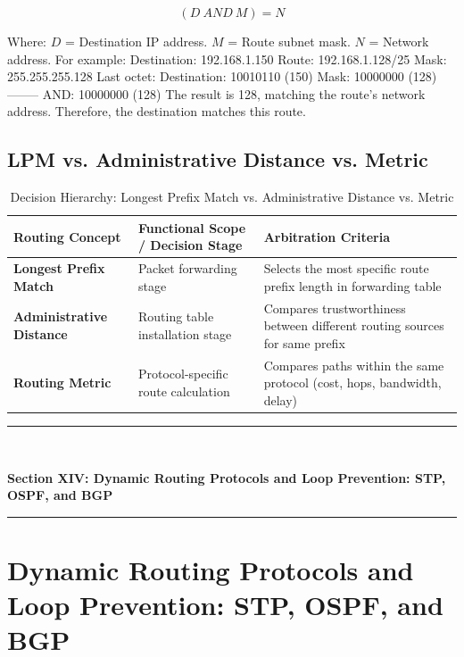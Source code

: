 \[
\boxed{(D\ AND\ M)=N}
\]

Where:
$D$ = Destination IP address.
$M$ = Route subnet mask.
$N$ = Network address.
For example:
Destination:
192.168.1.150
Route:
192.168.1.128/25
Mask:
255.255.255.128
Last octet:
Destination: 10010110 (150) Mask: 10000000 (128) -------- AND: 10000000 (128)
The result is 128, matching the route's network address.
Therefore, the destination matches this route.
\subsection{LPM vs. Administrative Distance vs. Metric}
\begin{table}[htbp]
\centering
\caption{Decision Hierarchy: Longest Prefix Match vs. Administrative Distance vs. Metric}
\label{tab:lpm_vs_ad_metric}
\begin{tabularx}{\textwidth}{p{3.8cm} X X}
\toprule
\textbf{Routing Concept} & \textbf{Functional Scope / Decision Stage} & \textbf{Arbitration Criteria} \\
\midrule
\textbf{Longest Prefix Match} & Packet forwarding stage & Selects the most specific route prefix length in forwarding table \\
\textbf{Administrative Distance} & Routing table installation stage & Compares trustworthiness between different routing sources for same prefix \\
\textbf{Routing Metric} & Protocol-specific route calculation & Compares paths within the same protocol (cost, hops, bandwidth, delay) \\
\bottomrule
\end{tabularx}
\end{table}

\newpage

\newpage
\begin{center}
\vspace{0.5em}
{\color{primary}\rule{0.45\textwidth}{1.2pt}\\[4pt]}
{\Large\bfseries\color{primary} Section XIV: Dynamic Routing Protocols and Loop Prevention: STP, OSPF, and BGP\\[2pt]}
{\color{primary}\rule{0.45\textwidth}{1.2pt}}
\vspace{0.5em}
\end{center}

\section{Dynamic Routing Protocols and Loop Prevention: STP, OSPF, and BGP}



